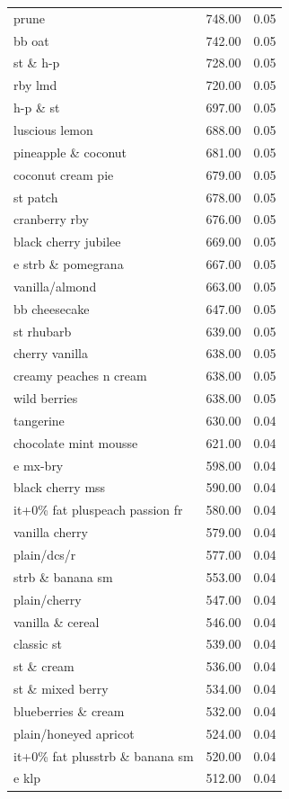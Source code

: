 \begin{table}
\begin{tabular}{lrr}
prune & 748.00 & 0.05 \\
bb oat & 742.00 & 0.05 \\
st \& h-p & 728.00 & 0.05 \\
rby lmd & 720.00 & 0.05 \\
h-p \& st & 697.00 & 0.05 \\
luscious lemon & 688.00 & 0.05 \\
pineapple \& coconut & 681.00 & 0.05 \\
coconut cream pie & 679.00 & 0.05 \\
st patch & 678.00 & 0.05 \\
cranberry rby & 676.00 & 0.05 \\
black cherry jubilee & 669.00 & 0.05 \\
e strb \& pomegrana & 667.00 & 0.05 \\
vanilla/almond & 663.00 & 0.05 \\
bb cheesecake & 647.00 & 0.05 \\
st rhubarb & 639.00 & 0.05 \\
cherry vanilla & 638.00 & 0.05 \\
creamy peaches n cream & 638.00 & 0.05 \\
wild berries & 638.00 & 0.05 \\
tangerine & 630.00 & 0.04 \\
chocolate mint mousse & 621.00 & 0.04 \\
e mx-bry & 598.00 & 0.04 \\
black cherry mss & 590.00 & 0.04 \\
it+0\% fat pluspeach passion fr & 580.00 & 0.04 \\
vanilla cherry & 579.00 & 0.04 \\
plain/dcs/r & 577.00 & 0.04 \\
strb \& banana sm & 553.00 & 0.04 \\
plain/cherry & 547.00 & 0.04 \\
vanilla \& cereal & 546.00 & 0.04 \\
classic st & 539.00 & 0.04 \\
st \& cream & 536.00 & 0.04 \\
st \& mixed berry & 534.00 & 0.04 \\
blueberries \& cream & 532.00 & 0.04 \\
plain/honeyed apricot & 524.00 & 0.04 \\
it+0\% fat plusstrb \& banana sm & 520.00 & 0.04 \\
e klp & 512.00 & 0.04 \\

\end{tabular}
\end{table}
